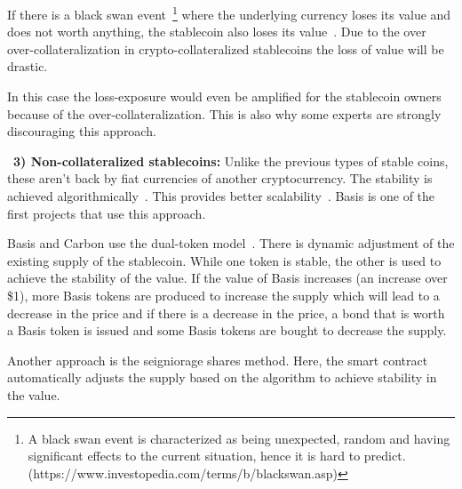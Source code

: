 If there is a black swan event~\footnote{A black swan event is characterized as being unexpected, random and having significant effects to the current situation, hence it is hard to predict.(https://www.investopedia.com/terms/b/blackswan.asp)} where the underlying currency loses its value and does not worth anything, the stablecoin also loses its value~\cite{coinsexplained}.  Due to the over over-collateralization in crypto-collateralized stablecoins the loss of value will be drastic.

In this case the loss-exposure would even be amplified for the stablecoin owners because of the over-collateralization. This is also why some experts are strongly discouraging this approach.


~\textbf{3) Non-collateralized stablecoins:} Unlike the previous types of stable coins, these aren't back by fiat currencies of another cryptocurrency. The stability is achieved algorithmically~\cite{linkedin}. This provides better scalability~\cite{report}. Basis is one of the first projects that use this approach.

Basis and Carbon use the dual-token model~\cite{cryptoinsider}. There is dynamic adjustment of the existing supply of the stablecoin. While one token is stable, the other is used to achieve the stability of the value. If the value of Basis increases (an increase over \$1), more Basis tokens are produced to increase the supply which will lead to a decrease in the price and if there is a decrease in the price, a bond that is worth a Basis token is issued and some Basis tokens are bought to decrease the supply.~\cite{euromoney}



Another approach is the seigniorage shares method\cite{overview}. Here, the smart contract automatically adjusts the supply based on the algorithm to achieve stability in the value.



